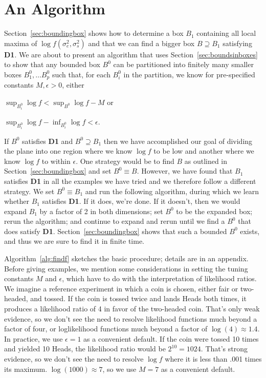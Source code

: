 \documentclass{report}
\newcommand{\RL}{f}
\newcommand{\logRL}{\log\RL}
\newcommand{\sigssq}{\sigma_s^2}
\newcommand{\sigesq}{\sigma_e^2}
\newcommand{\logRLss}{\logRL(\sigesq,\sigssq)}
\begin{document}
\section{An Algorithm}
\label{sec:algorithm}
Section~\ref{sec:boundingbox} shows how to determine a box $B_1$ containing all local maxima of $\logRLss$ and   that we can find a bigger box $B\supseteq B_1$ satisfying \textbf{D1}.  We are about to present an algorithm that uses Section~\ref{sec:boundsinboxes} to show that any bounded box $B^0$ can be partitioned into finitely many smaller boxes $B^0_1, \dots B^0_p$  such that, for each $B^0_i$ in the partition, we know for pre-specified constants $M, \epsilon >0$, either
\begin{enumerate*}[label=(\alph*)]
\item $\sup_{B^0_i} \logRL < \sup_{B^0} \logRL -M$ or
\item $\sup_{B^0_i} \logRL - \inf_{B^0_i} \logRL < \epsilon$.
\end{enumerate*}
If $B^0$ satisfies \textbf{D1} and $B^0\supseteq B_1$ then we have accomplished our goal of dividing the plane into one region where we know $\logRL$ to be low and another where we know $\logRL$ to within $\epsilon$.  One strategy would be to find $B$ as outlined in Section~\ref{sec:boundingbox} and set $B^0 \equiv B$.  However, we have found that $B_1$ satisfies \textbf{D1} in all the examples we have tried and we therefore follow a different strategy.  We set $B^0 \equiv B_1$ and run the following algorithm, during which we learn whether $B_1$ satisfies \textbf{D1}.  If it does, we're done.  If it doesn't, then we would expand $B_1$ by a factor of 2 in both dimensions; set $B^0$ to be the expanded box; rerun the algorithm; and continue to expand and rerun until we find a $B^0$ that does satisfy \textbf{D1}.  Section~\ref{sec:boundingbox} shows that such a bounded $B^0$ exists, and thus we are sure to find it in finite time.

Algorithm~\ref{alg:findf} sketches the basic procedure; details are in an appendix.  Before giving examples, we mention some considerations in setting the tuning constants $M$ and $\epsilon$, which have to do with the interpretation of likelihood ratios.  We imagine a reference experiment in which a coin is chosen, either fair or two-headed, and tossed.  If the coin is tossed twice and lands Heads both times, it produces a likelihood ratio of 4 in favor of the two-headed coin.  That's only weak evidence, so we don't see the need to resolve likelihood functions much beyond a factor of four, or loglikelihood functions much beyond a factor of $\log(4) \approx 1.4$.  In practice, we use $\epsilon = 1$ as a convenient default.  If the coin were tossed 10 times and yielded 10 Heads, the likelihood ratio would be $2^{10} = 1024$.  That's strong evidence, so we don't see the need to resolve $\logRL$ where it is less than .001 times its maximum.  $\log(1000) \approx 7$, so we use $M = 7$ as a convenient default.
\end{document}
